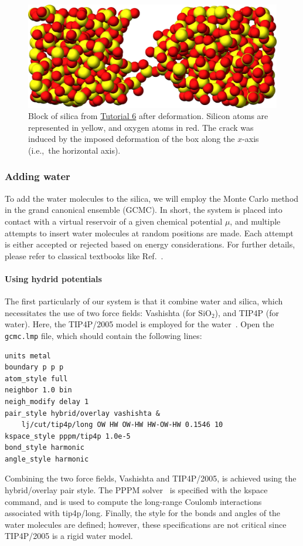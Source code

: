 \documentclass[9pt,tutorial]{livecoms}
\newcommand{\lmpcmd}[1]{\hspace{0pt}\colorbox{listing}{\textcolor{command}{\small{#1}}}\hspace{0pt}} %
\newcommand{\flecmd}[1]{\textcolor{command}{\texttt{#1}}} %
\begin{document}
\begin{figure}
\centering
\includegraphics[width=\linewidth]{GCMC-cracked}
\caption{Block of silica from \hyperref[gcmc-silica-label]{Tutorial 6}
after deformation.  Silicon atoms are represented in yellow,
and oxygen atoms in red.  The crack was induced by the
imposed deformation of the box along the $x$-axis (i.e.,~the horizontal axis).}
\label{fig:GCMC-cracked}
\end{figure}

\subsubsection{Adding water}

\noindent To add the water molecules to the silica, we will employ
the Monte Carlo method in the grand canonical ensemble (GCMC).  In short, the
system is placed into contact with a virtual reservoir of a given chemical potential
$\mu$, and multiple attempts to insert water molecules at random positions are
made.  Each attempt is either accepted or rejected based on energy considerations.
For further details, please refer to classical textbooks like Ref.~.

\paragraph{Using hydrid potentials}

\noindent The first particularly of our system is that it
combine water and silica, which necessitates the use
of two force fields: Vashishta (for $\text{SiO}_2$), and
TIP4P (for water).  Here, the TIP4P/2005 model is employed for the
water~\cite{abascal2005general}.  Open the \flecmd{gcmc.lmp} file, which
should contain the following lines:
\begin{lstlisting}
units metal
boundary p p p
atom_style full
neighbor 1.0 bin
neigh_modify delay 1
pair_style hybrid/overlay vashishta &
    lj/cut/tip4p/long OW HW OW-HW HW-OW-HW 0.1546 10
kspace_style pppm/tip4p 1.0e-5
bond_style harmonic
angle_style harmonic
\end{lstlisting}
Combining the two force fields, Vashishta and TIP4P/2005, is achieved
using the \lmpcmd{hybrid/overlay} pair style.  The PPPM
solver~\cite{luty1996calculating} is specified with the \lmpcmd{kspace}
command, and is used to compute the long-range Coulomb interactions associated
with \lmpcmd{tip4p/long}.  Finally, the style for the bonds
and angles of the water molecules are defined; however, these specifications are
not critical since TIP4P/2005 is a rigid water model.
\end{document}
